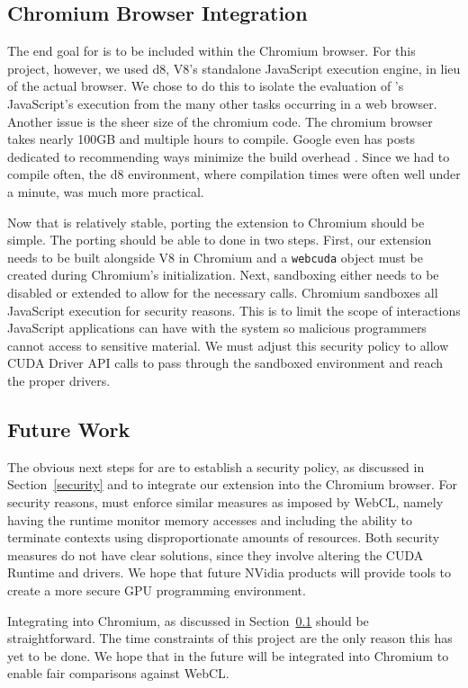 \subsection{Chromium Browser Integration} 
\label{chromeIntegration}
The end goal for \name is to be included within the
Chromium browser. For this project, however, we used d8, V8's standalone
JavaScript execution engine, in lieu of the actual browser. We chose to do this
to isolate the evaluation of \namens's JavaScript's execution from the many other
tasks occurring in a web browser.  Another issue is the sheer size of the chromium code.
The chromium browser takes nearly 100GB and multiple hours to compile. Google
even has 
posts dedicated to recommending ways minimize the build overhead
\cite{linuxfasterbuilds}.  Since we had to compile often, the d8 environment,
where compilation times were often well under a minute, was much more practical.

Now that \name is relatively stable, porting the extension to Chromium should be
simple. The porting should be able to done in two steps. First, our extension
needs to be built alongside V8 in Chromium and a \texttt{webcuda} object must be
created during Chromium's initialization.  Next, sandboxing either needs to be
disabled or extended to allow for the necessary \name calls. Chromium sandboxes
all JavaScript execution for security reasons. This is to limit the scope of
interactions JavaScript applications can have with the system so malicious
programmers cannot access to sensitive material. We must adjust this security
policy to allow CUDA Driver API calls to pass through the sandboxed environment
and reach the proper drivers. 


\subsection{Future Work}
\label{future}
The obvious next steps for \name are to establish a security policy, as
discussed in Section~\ref{security} and to integrate our extension into the
Chromium browser. For security reasons, \name must enforce similar measures as
imposed by WebCL, namely having the runtime monitor memory accesses and
including the ability to terminate contexts using disproportionate amounts of
resources. Both security measures do not have clear solutions, since they involve
altering the CUDA Runtime and drivers. We hope that future NVidia products will
provide tools to create a more secure GPU programming environment.

Integrating \name into Chromium, as discussed in Section~\ref{chromeIntegration} should be
straightforward. The time constraints of this project are the only reason this
has yet to be done. We hope that in the future \name will be integrated into
Chromium to enable fair comparisons against WebCL.

